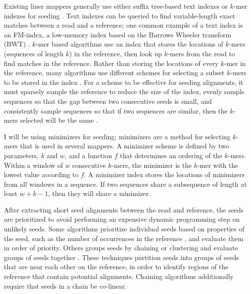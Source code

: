 \documentclass[11pt]{ucscthesis}
\begin{document}
Existing liner mappers generally use either suffix tree-based text indexes or $k$-mer indexes for seeding \cite{li_survey_2010}.
Text indexes can be queried to find variable-length exact matches between a read and a reference; one common example of a text index is an FM-index, a low-memory index based on the Burrows Wheeler transform (BWT) \cite{li_bwa_mem_2013,langmead_bowtie2_2012,li_soap2_2009}.
$k$-mer based algorithms use an index that stores the locations of $k$-mers (sequences of length $k$) in the reference, then look up $k$-mers from the read to find matches in the reference.
Rather than storing the locations of every $k$-mer in the reference, many algorithms use different schemes for selecting a subset $k$-mers to be stored in the index \cite{li_minimap2_2018,lee_mosaik_2014,jain_mashmap_2018, edgar_urmap_2020,edgar_syncmers_2020}.
For a scheme to be effective for seeding alignments, it must sparsely sample the reference to reduce the size of the index, evenly sample sequences so that the gap between two consecutive seeds is small, and consistently sample sequences so that if two sequences are similar, then the $k$-mers selected will be the same \cite{marcais_improving_2017}.

I will be using minimizers for seeding; minimizers are a method for selecting $k$-mers that is used in several mappers.
A minimizer scheme is defined by two parameters, $k$ and $w$, and a function $f$ that determines an ordering of the $k$-mers.
Within a window of $w$ consecutive $k$-mers, the minimizer is the $k$-mer with the lowest value according to $f$.
A minimizer index stores the locations of minimizers from all windows in a sequence.
If two sequences share a subsequence of length at least $w+k-1$, then they will share a minimizer.


After extracting short seed alignments between the read and reference, the seeds are prioritized to avoid performing an expensive dynamic programming step on unlikely seeds.
Some algorithms prioritize individual seeds based on properties of the seed, such as the number of occurrences in the reference  \cite{langmead_bowtie2_2012}, and evaluate them in order of priority.
Others groups seeds by chaining or clustering and evaluate groups of seeds together \cite{li_bwa_mem_2013,li_minimap2_2018,lee_mosaik_2014,jain_mashmap_2018}.
These techniques partition seeds into groups of seeds that are near each other on the reference, in order to identify regions of the reference that contain potential alignments.
Chaining algorithms additionally require that seeds in a chain be co-linear\cite{li_bwa_mem_2013,li_minimap2_2018}.
\end{document}

